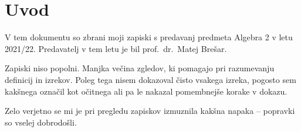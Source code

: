 \section*{Uvod}

V tem dokumentu so zbrani moji zapiski s predavanj predmeta Algebra
2 v letu 2021/22. Predavatelj v tem letu je bil prof.~dr.~Matej
Brešar.

Zapiski niso popolni. Manjka večina zgledov, ki pomagajo pri
razumevanju definicij in izrekov. Poleg tega nisem dokazoval čisto
vsakega izreka, pogosto sem kakšnega označil kot očitnega ali pa le
nakazal pomembnejše korake v dokazu.

Zelo verjetno se mi je pri pregledu zapiskov izmuznila kakšna napaka
-- popravki so vselej dobrodošli.
